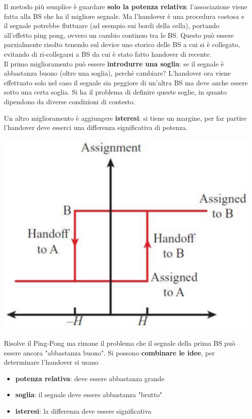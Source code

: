 Il metodo più semplice è guardare \textbf{solo la potenza relativa}: l'associazione viene fatta alla BS che ha il migliore segnale. Ma l'handover è una procedura costosa e il segnale potrebbe fluttuare (ad esempio sui bordi della cella), portando all'effetto ping pong, ovvero un cambio continuo tra le BS. Questo può essere parzialmente risolto tenendo sul device uno storico delle BS a cui si è collegato, evitando di ri-collegarsi a BS da cui è stato fatto handover di recente.\\

Il primo miglioramento può essere \textbf{introdurre una soglia}: se il segnale è abbastanza buono (oltre una soglia), perché cambiare? L'handover ora viene effettuato solo nel caso il segnale sia peggiore di un'altra BS ma deve anche essere sotto una certa soglia. Si ha il problema di definire queste soglie, in quanto dipendono da diverse condizioni di contesto.\\

\newpage

Un altro miglioramento è aggiungere \textbf{isteresi}: si tiene un margine, per far partire l'handover deve esserci una differenza significativa di potenza. 
\begin{center}
	\includegraphics[width=0.55\linewidth]{img/mobile/isteresi}
\end{center}

Risolve il Ping-Pong ma rimane il problema che il segnale della prima BS può essere ancora "abbastanza buono". Si possono \textbf{combinare le idee}, per determinare l'handover si usano 
\begin{itemize}
	\item \textbf{potenza relativa}: deve essere abbastanza grande
	\item \textbf{soglia}: il segnale deve essere abbastanza "brutto"
	\item \textbf{isteresi}: la differenza deve essere significativa
\end{itemize}

